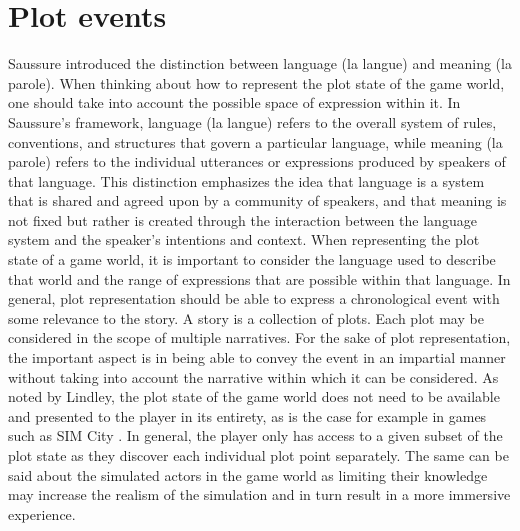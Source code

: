 
\section{Plot events}

Saussure introduced the distinction between language (la langue) and meaning (la parole)\cite{gordon2004langue}.
When thinking about how to represent the plot state of the game world, one should take into account the possible space of expression within it.
%
In Saussure's framework, language (la langue) refers to the overall system of rules, conventions, and structures that govern a particular language, while meaning (la parole) refers to the individual utterances or expressions produced by speakers of that language.
This distinction emphasizes the idea that language is a system that is shared and agreed upon by a community of speakers, and that meaning is not fixed but rather is created through the interaction between the language system and the speaker's intentions and context.
When representing the plot state of a game world, it is important to consider the language used to describe that world and the range of expressions that are possible within that language.
%
In general, plot representation should be able to express a chronological event with some relevance to the story.
A story is a collection of plots.
Each plot may be considered in the scope of multiple narratives.
For the sake of plot representation, the important aspect is in being able to convey the event in an impartial manner without taking into account the narrative within which it can be considered.
As noted by Lindley, the plot state of the game world does not need to be available and presented to the player in its entirety, as is the case for example in games such as SIM City \cite{lindley2005story}.
In general, the player only has access to a given subset of the plot state as they discover each individual plot point separately.
The same can be said about the simulated actors in the game world as limiting their knowledge may increase the realism of the simulation and in turn result in a more immersive experience.


